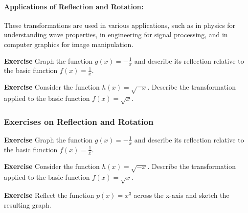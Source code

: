 \documentclass[a4paper,12pt]{book}
\newenvironment{exercise}[1][]
  {\par\medskip\noindent\textbf{Exercise #1} \rmfamily}
  {\medskip}
\begin{document}

\paragraph{Applications of Reflection and Rotation:}
These transformations are used in various applications, such as in physics for understanding wave properties, in engineering for signal processing, and in computer graphics for image manipulation.

\begin{exercise}
Graph the function \( g(x) = -\frac{1}{x} \) and describe its reflection relative to the basic function \( f(x) = \frac{1}{x} \).
\end{exercise}

\begin{exercise}
Consider the function \( h(x) = \sqrt{-x} \). Describe the transformation applied to the basic function \( f(x) = \sqrt{x} \).
\end{exercise}

\subsubsection*{Exercises on Reflection and Rotation}

\begin{exercise}
Graph the function \( g(x) = -\frac{1}{x} \) and describe its reflection relative to the basic function \( f(x) = \frac{1}{x} \).
\end{exercise}

\begin{exercise}
Consider the function \( h(x) = \sqrt{-x} \). Describe the transformation applied to the basic function \( f(x) = \sqrt{x} \).
\end{exercise}

\begin{exercise}
Reflect the function \( p(x) = x^3 \) across the x-axis and sketch the resulting graph.
\end{exercise}
\end{document}
